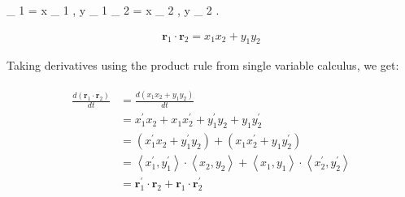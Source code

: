 \documentclass[11pt]{article}
\begin{document}
      _ { 1 } = \left\langle x _ { 1 } , y _ { 1 } \right\rangle \quad {} \quad {} _ { 2 } = \left\langle x _ { 2 } , y _ { 2 } \right\rangle . 

    \begin{gather*}
        \mathbf { r } _ { 1 } \cdot \mathbf { r } _ { 2 } = x _ { 1 } x _ { 2 } + y _ { 1 } y _ { 2 }
    \end{gather*}

    Taking derivatives using the product rule from single variable calculus, we get:

    \begin{gather*}
        \left.\begin{aligned}
                  \frac { d \left( \mathbf { r } _ { 1 } \cdot \mathbf { r } _ { 2 } \right) } { d t } & = \frac { d \left( x _ { 1 } x _ { 2 } + y _ { 1 } y _ { 2 } \right) } { d t } \\ & = x _ { 1 } ^ { \prime } x _ { 2 } + x _ { 1 } x _ { 2 } ^ { \prime } + y _ { 1 } ^ { \prime } y _ { 2 } + y _ { 1 } y _ { 2 } ^ { \prime } \\ & = \left( x _ { 1 } ^ { \prime } x _ { 2 } + y _ { 1 } ^ { \prime } y _ { 2 } \right) + \left( x _ { 1 } x _ { 2 } ^ { \prime } + y _ { 1 } y _ { 2 } ^ { \prime } \right) \\ & = \left\langle x _ { 1 } ^ { \prime } , y _ { 1 } ^ { \prime } \right\rangle \cdot \left\langle x _ { 2 } , y _ { 2 } \right\rangle + \left\langle x _ { 1 } , y _ { 1 } \right\rangle \cdot \left\langle x _ { 2 } ^ { \prime } , y _ { 2 } ^ { \prime } \right\rangle \\ & = \mathbf { r } _ { 1 } ^ { \prime } \cdot \mathbf { r } _ { 2 } + \mathbf { r } _ { 1 } \cdot \mathbf { r } _ { 2 } ^ { \prime }
        \end{aligned} \right.
    \end{gather*}
\end{document}
